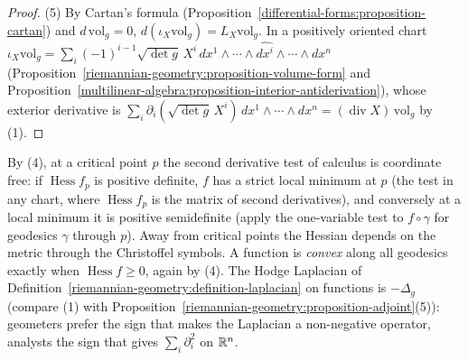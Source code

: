 \begin{proof}
(5) By Cartan's formula (Proposition~\ref{differential-forms:proposition-cartan}) and $d\,\mathrm{vol}_g = 0$, $d(\iota_X\mathrm{vol}_g) = L_X\mathrm{vol}_g$. In a positively oriented chart
$\iota_X\mathrm{vol}_g = \sum_i(-1)^{i-1}\sqrt{\det g}\,X^i\,dx^1 \wedge \cdots \wedge \widehat{dx^i} \wedge \cdots \wedge dx^n$ (Proposition~\ref{riemannian-geometry:proposition-volume-form} and
Proposition~\ref{multilinear-algebra:proposition-interior-antiderivation}), whose exterior derivative is $\sum_i\partial_i(\sqrt{\det g}\,X^i)\,dx^1 \wedge \cdots \wedge dx^n = (\operatorname{div}X)\,\mathrm{vol}_g$ by (1).
\end{proof}

By (4), at a critical point $p$ the second derivative test of calculus is coordinate free: if $\operatorname{Hess}f_p$ is positive definite, $f$ has a strict local minimum at $p$ (the test in any
chart, where $\operatorname{Hess}f_p$ is the matrix of second derivatives), and conversely at a local minimum it is positive semidefinite (apply the one-variable test to $f \circ \gamma$ for geodesics $\gamma$
through $p$). Away from critical points the Hessian depends on the metric through the Christoffel
symbols. A function is \emph{convex} along all geodesics exactly when $\operatorname{Hess}f \geq 0$, again by (4). The Hodge Laplacian of Definition~\ref{riemannian-geometry:definition-laplacian} on functions is
$-\Delta_g$ (compare (1) with Proposition~\ref{riemannian-geometry:proposition-adjoint}(5)): geometers prefer the sign that makes the Laplacian a non-negative operator, analysts the sign that gives $\sum_i\partial_i^2$ on
$\mathbb{R}^n$.

